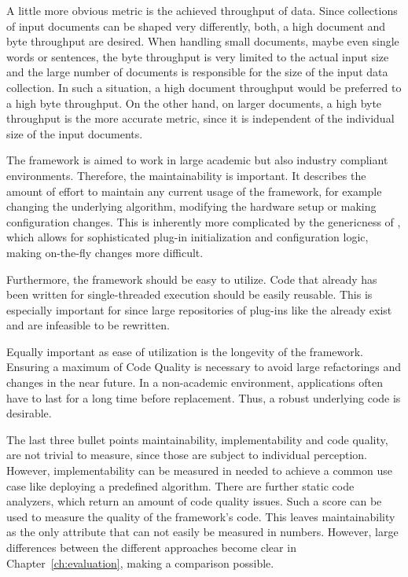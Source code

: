 A little more obvious metric is the achieved throughput of data. Since collections of input documents can be shaped very differently, both, a high document and byte throughput are desired. When handling small documents, maybe even single words or sentences, the byte throughput is very limited to the actual input size and the large number of documents is responsible for the size of the input data collection. In such a situation, a high document throughput would be preferred to a high byte throughput. On the other hand, on larger documents, a high byte throughput is the more accurate metric, since it is independent of the individual size of the input documents.

The framework is aimed to work in large academic but also industry compliant environments. Therefore, the maintainability is important. It describes the amount of effort to maintain any current usage of the framework, for example changing the underlying \nlp{} algorithm, modifying the hardware setup or making configuration changes. This is inherently more complicated by the genericness of \uima{}, which allows for sophisticated plug-in initialization and configuration logic, making on-the-fly changes more difficult.

Furthermore, the framework should be easy to utilize. Code that already has been written for single-threaded execution should be easily reusable. This is especially important for \uima{} since large repositories of plug-ins like the \dkpro{} \cite{dkpro} already exist and are infeasible to be rewritten. 

Equally important as ease of utilization is the longevity of the framework. Ensuring a maximum of Code Quality is necessary to avoid large refactorings and \api{} changes in the near future. In a non-academic environment, applications often have to last for a long time before replacement. Thus, a robust underlying code is desirable.

The last three bullet points maintainability, implementability and code quality, are not trivial to measure, since those are subject to individual perception. However, implementability can be measured in \loc{} needed to achieve a common use case like deploying a predefined \nlp{} algorithm. There are further static code analyzers, which return an amount of code quality issues. Such a score can be used to measure the quality of the framework's code. This leaves maintainability as the only attribute that can not easily be measured in numbers. However, large differences between the different approaches become clear in Chapter~\ref{ch:evaluation}, making a comparison possible.

